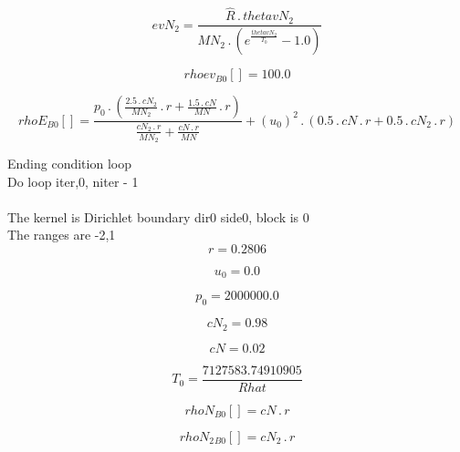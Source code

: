 \documentclass{article}
\begin{document}
\begin{dmath}evN_{2} = \frac{\hat{R} \,.\, thetavN_{2}}{MN_{2} \,.\, \left(e^{\frac{thetavN_{2}}{T_{0}}} - 1.0\right)}\end{dmath}

\begin{dmath}{rhoev{_{B0}}}[{}] = 100.0\end{dmath}

\begin{dmath}{rhoE{_{B0}}}[{}] = \frac{p_{0} \,.\, \left(\frac{2.5 \,.\, cN_{2}}{MN_{2}} \,.\, r + \frac{1.5 \,.\, cN}{MN} \,.\, r\right)}{\frac{cN_{2} \,.\, r}{MN_{2}} + \frac{cN \,.\, r}{MN}} + \left(u_{0} \right)^{2} \,.\, \left(0.5 \,.\, cN \,.\, 
r + 0.5 \,.\, cN_{2} \,.\, r\right)\end{dmath}

\noindent Ending condition loop %
\\\noindent Do loop iter,0, niter - 1\\
\\\noindent The kernel is Dirichlet boundary dir0 side0, block is 0\\\noindent The ranges are -2,1\\\begin{dmath}r = 0.2806\end{dmath}

\begin{dmath}u_{0} = 0.0\end{dmath}

\begin{dmath}p_{0} = 2000000.0\end{dmath}

\begin{dmath}cN_{2} = 0.98\end{dmath}

\begin{dmath}cN = 0.02\end{dmath}

\begin{dmath}T_{0} = \frac{7127583.74910905}{Rhat}\end{dmath}

\begin{dmath}{rhoN{_{B0}}}[{}] = cN \,.\, r\end{dmath}

\begin{dmath}{rhoN_{2}{_{B0}}}[{}] = cN_{2} \,.\, r\end{dmath}
\end{document}
